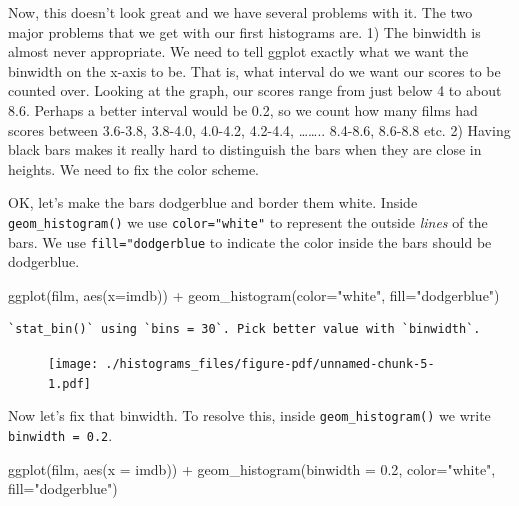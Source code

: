 \documentclass[
  letterpaper,
  DIV=11,
  numbers=noendperiod]{scrreprt}
\newenvironment{Shaded}{\begin{snugshade}}{\end{snugshade}}
\newcommand{\AttributeTok}[1]{\textcolor[rgb]{0.40,0.45,0.13}{#1}}
\newcommand{\FloatTok}[1]{\textcolor[rgb]{0.68,0.00,0.00}{#1}}
\newcommand{\FunctionTok}[1]{\textcolor[rgb]{0.28,0.35,0.67}{#1}}
\newcommand{\NormalTok}[1]{\textcolor[rgb]{0.00,0.23,0.31}{#1}}
\newcommand{\SpecialCharTok}[1]{\textcolor[rgb]{0.37,0.37,0.37}{#1}}
\newcommand{\StringTok}[1]{\textcolor[rgb]{0.13,0.47,0.30}{#1}}
\begin{document}
Now, this doesn't look great and we have several problems with it. The
two major problems that we get with our first histograms are. 1) The
binwidth is almost never appropriate. We need to tell ggplot exactly
what we want the binwidth on the x-axis to be. That is, what interval do
we want our scores to be counted over. Looking at the graph, our scores
range from just below 4 to about 8.6. Perhaps a better interval would be
0.2, so we count how many films had scores between 3.6-3.8, 3.8-4.0,
4.0-4.2, 4.2-4.4, \ldots\ldots.. 8.4-8.6, 8.6-8.8 etc. 2) Having black
bars makes it really hard to distinguish the bars when they are close in
heights. We need to fix the color scheme.

OK, let's make the bars dodgerblue and border them white. Inside
\texttt{geom\_histogram()} we use \texttt{color="white"} to represent
the outside \emph{lines} of the bars. We use \texttt{fill="dodgerblue}
to indicate the color inside the bars should be dodgerblue.

\begin{Shaded}
\begin{Highlighting}[]
\FunctionTok{ggplot}\NormalTok{(film, }\FunctionTok{aes}\NormalTok{(}\AttributeTok{x=}\NormalTok{imdb)) }\SpecialCharTok{+} 
  \FunctionTok{geom\_histogram}\NormalTok{(}\AttributeTok{color=}\StringTok{"white"}\NormalTok{, }\AttributeTok{fill=}\StringTok{"dodgerblue"}\NormalTok{) }
\end{Highlighting}
\end{Shaded}

\begin{verbatim}
`stat_bin()` using `bins = 30`. Pick better value with `binwidth`.
\end{verbatim}

\begin{figure}[H]

{\centering \texttt{[image: ./histograms\_files/figure-pdf/unnamed-chunk-5-1.pdf]}

}

\end{figure}

Now let's fix that binwidth. To resolve this, inside
\texttt{geom\_histogram()} we write \texttt{binwidth\ =\ 0.2}.

\begin{Shaded}
\begin{Highlighting}[]
\FunctionTok{ggplot}\NormalTok{(film, }\FunctionTok{aes}\NormalTok{(}\AttributeTok{x =}\NormalTok{ imdb)) }\SpecialCharTok{+} 
  \FunctionTok{geom\_histogram}\NormalTok{(}\AttributeTok{binwidth =} \FloatTok{0.2}\NormalTok{, }\AttributeTok{color=}\StringTok{"white"}\NormalTok{, }\AttributeTok{fill=}\StringTok{"dodgerblue"}\NormalTok{) }
\end{Highlighting}
\end{Shaded}
\end{document}
